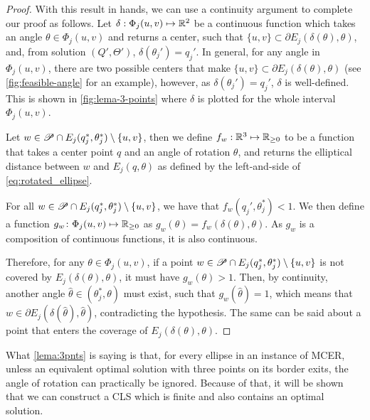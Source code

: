 \begin{proof}
	With this result in hands, we can use a continuity argument to complete our proof as follows.
	Let $\delta : \Phi_j(u,v) \mapsto \mathbb{R}^2$ be a continuous function which takes an angle $\theta\in\Phi_j(u,v)$ and returns a center, such that $\{u,v\} \subset \partial E_j(\delta(\theta), \theta)$, and, from solution $(Q', \Theta')$, $\delta(\theta_j') = q_j'$.
	In general, for any angle in $\Phi_j(u,v)$, there are two possible centers that make $\{u,v\} \subset \partial E_j(\delta(\theta), \theta)$ (see \autoref{fig:feasible-angle} for an example), however, as $\delta(\theta_j') = q_j'$, $\delta$ is well-defined. This is shown in \autoref{fig:lema-3-points} where $\delta$ is plotted for the whole interval $\Phi_j(u,v)$.
	
	Let $w\in \mathscr{P} \cap E_j(q_j^*, \theta_j^*) \setminus \{u,v\}$, then we define $f_w  : \mathbb{R}^3 \mapsto \mathbb{R}_{\ge0}$ to be a function that takes a center point $q$ and an angle of rotation $\theta$, and returns the elliptical distance between $w$ and $E_j(q, \theta)$ as defined by the left-and-side of \autoref{eq:rotated_ellipse}.
	
	For all $w\in \mathscr{P} \cap E_j(q_j^*, \theta_j^*)\setminus \{u,v\}$, we have that $f_w(q_j', \theta_j^*) < 1$. We then define a function $g_w\colon \Phi_j(u,v) \mapsto \mathbb{R}_{\ge0}$ as $g_w(\theta) = f_w(\delta(\theta), \theta)$. As $g_w$ is a composition of continuous functions, it is also continuous.
	
	Therefore, for any $\theta\in\Phi_j(u,v)$, if a point $w \in \mathscr{P} \cap E_j(q_j^*, \theta_j^*)\setminus\{u,v\}$ is not covered by $E_j(\delta(\theta), \theta)$, it must have $g_w(\theta)>1$. Then, by continuity, another angle $\hat{\theta} \in(\theta_j^*, \theta)$ must exist, such that $g_w(\hat{\theta})=1$, which means that $w\in \partial E_j(\delta(\hat{\theta}), \hat{\theta})$, contradicting the hypothesis. The same can be said about a point that enters the coverage of $E_j(\delta(\theta), \theta)$.
\end{proof}


What \autoref{lema:3pnts} is saying is that, for every ellipse in an instance of MCER, unless an equivalent optimal solution with three points on its border exits, the angle of rotation can practically be ignored. Because of that, it will be shown that we can construct a CLS which is finite and also contains an optimal solution.

